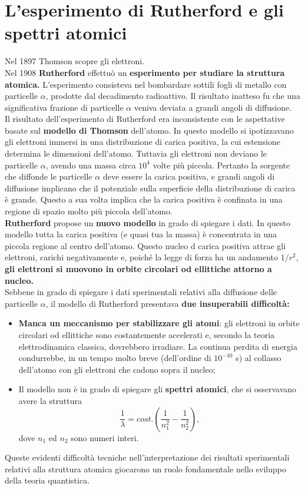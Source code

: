 \documentclass[a4paper,12pt,oneside]{book}
\begin{document}
\section{L'esperimento di Rutherford e gli spettri atomici}
Nel 1897 Thomson scopre gli elettroni.\\
Nel 1908 \textbf{Rutherford} effettuò un \textbf{esperimento per studiare la struttura atomica.} L'esperimento consisteva nel bombardare sottili fogli di metallo con particelle $\alpha$, prodotte dal decadimento radioattivo. Il risultato inatteso fu che una significativa frazione di particelle $\alpha$ veniva deviata a grandi angoli di diffusione.\\
Il risultato dell'esperimento di Rutherford era inconsistente con le aspettative basate sul \textbf{modello di Thomson} dell'atomo. In questo modello si ipotizzavano gli elettroni immersi in una distribuzione di carica positiva, la cui estensione determina le dimensioni dell'atomo. Tuttavia gli elettroni non deviano le particelle $\alpha$, avendo una massa circa $10^4$ volte più piccola. Pertanto la sorgente che diffonde le particelle $\alpha$ deve essere la carica positiva, e grandi angoli di diffusione implicano che il potenziale sulla superficie della distribuzione di carica è grande. Questo a sua volta implica che la carica positiva è confinata in una regione di spazio molto più piccola dell'atomo.\\
\textbf{Rutherford} propose un \textbf{nuovo modello} in grado di spiegare i dati. In questo modello tutta la carica positiva (e quasi tua la massa) è concentrata in una piccola regione al centro dell'atomo. Questo nucleo d carica positiva attrae gli elettroni, carichi negativamente e, poiché la legge di forza ha un andamento $1/r^2$, \textbf{gli elettroni si muovono in orbite circolari od ellittiche attorno a nucleo.}\\
Sebbene in grado di spiegare i dati sperimentali relativi alla diffusione delle particelle $\alpha$, il modello di Rutherford presentava \textbf{due insuperabili difficoltà:}
	\begin{itemize}
		\item \textbf{Manca un meccanismo per stabilizzare gli atomi}: gli elettroni in orbite circolari od ellittiche sono costantemente accelerati e, secondo la teoria elettrodinamica classica, dovrebbero irradiare. La continua perdita di energia condurrebbe, in un tempo molto breve (dell'ordine di $10^{-10}$ s) al collasso dell'atomo con gli elettroni che cadono sopra il nucleo;
		\item Il modello non è in grado di spiegare gli \textbf{spettri atomici}, che si osservavano avere la struttura
			\begin{equation}
				\boxed{
					\frac{1}{\lambda} = cost. \left( \frac{1}{n_1 ^2}-\frac{1}{n_2 ^2} \right),
					}
			\end{equation}
		dove $n_1$ ed $n_2$ sono numeri interi.
\end{itemize}

Queste evidenti difficoltà tecniche nell'interpretazione dei risultati sperimentali relativi alla struttura atomica giocarono un ruolo fondamentale nello sviluppo della teoria quantistica.
\end{document}
